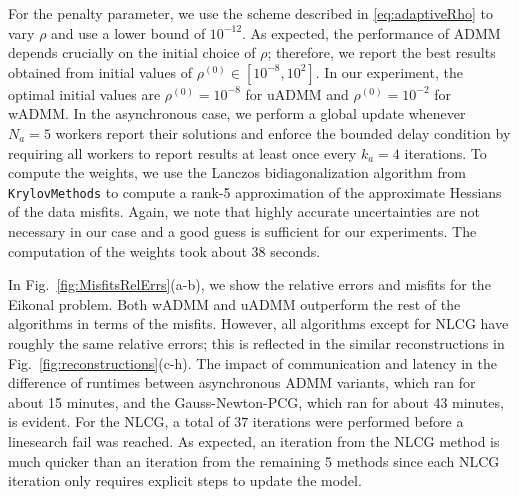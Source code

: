 \documentclass[11pt]{article}          %
\begin{document}
For the penalty parameter, we use the scheme described in \eqref{eq:adaptiveRho} to vary $\rho$ and use a lower bound of $10^{-12}$. As expected, the performance of ADMM depends crucially on the initial choice of $\rho$; therefore, we report the best results obtained from initial values of $\rho^{(0)} \in [10^{-8}, 10^2]$. In our experiment, the optimal initial values are $\rho^{(0)} = 10^{-8}$ for uADMM and $\rho^{(0)} = 10^{-2}$ for wADMM. In the asynchronous case, we perform a global update whenever $N_a=5$ workers report their solutions and enforce the bounded delay condition by requiring all workers to report results at least once every $k_a=4$ iterations. To compute the weights, we use the Lanczos bidiagonalization algorithm from \texttt{KrylovMethods} \cite{LarsKrylovMethods} to compute a rank-5 approximation of the approximate Hessians of the data misfits. Again, we note that highly accurate uncertainties are not necessary in our case and a good guess is sufficient for our experiments. The computation of the weights took about 38 seconds.

In Fig.~\ref{fig:MisfitsRelErrs}(a-b), we show the relative errors and misfits for the Eikonal problem. Both wADMM and uADMM outperform the rest of the algorithms in terms of the misfits. However, all algorithms except for NLCG have roughly the same relative errors; this is reflected in the similar reconstructions in Fig.~\ref{fig:reconstructions}(c-h). The impact of communication and latency in the difference of runtimes between asynchronous ADMM variants, which ran for about 15 minutes, and the Gauss-Newton-PCG, which ran for about 43 minutes, is evident.
For the NLCG, a total of $37$ iterations were performed before a linesearch fail was reached. As expected, an iteration from the NLCG method is much quicker than an iteration from the remaining 5 methods since each NLCG iteration only requires explicit steps to update the model.
\end{document}
